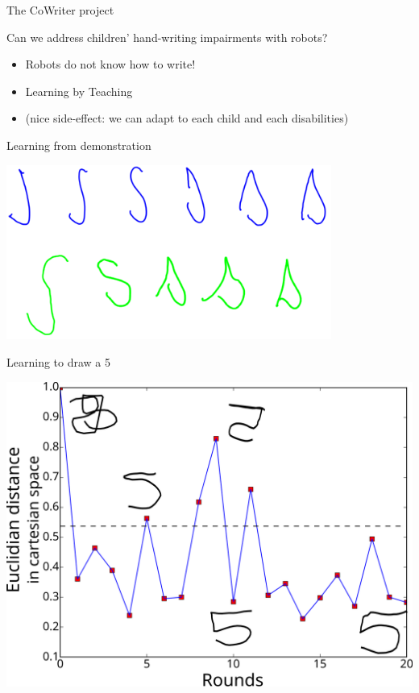 \documentclass[xcolor=table]{beamer}
\begin{document}
{

\begin{frame}{The CoWriter project}

    Can we address children' hand-writing impairments with robots?

    \begin{itemize}
        \item<2-> Robots do not know how to write!
        \item<3-> Learning by Teaching
        \item<4-> (nice side-effect: we can adapt to each child and each disabilities)
    \end{itemize}
\end{frame}
}

{

\begin{frame}{Learning from demonstration}
    \begin{center}
    \includegraphics[width=0.8\textwidth]{cowriter/learningSdemo.png}
    \end{center}
\end{frame}

}

{
\begin{frame}{Learning to draw a 5}
    \begin{center}
        \includegraphics[width=0.8\linewidth]{cowriter/henry5}
    \end{center}
\end{frame}
}
\end{document}
